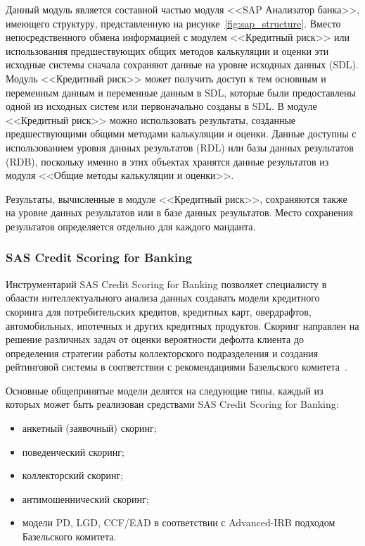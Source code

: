 Данный модуль является составной частью модуля <<SAP Анализатор банка>>,
имеющего структуру, представленную на рисунке~\ref{fig:sap_structure}.
Вместо непосредственного обмена информацией с модулем <<Кредитный риск>>
или использования предшествующих общих методов калькуляции и оценки эти исходные
системы сначала сохраняют данные на уровне исходных данных (SDL).
Модуль <<Кредитный риск>> может получить доступ к тем основным и переменным данным и переменные данным в SDL,
которые были предоставлены одной из исходных систем или первоначально созданы в SDL.
В модуле <<Кредитный риск>> можно использовать результаты, созданные предшествующими
общими методами калькуляции и оценки. Данные доступны с использованием уровня данных результатов (RDL)
или базы данных результатов (RDB),
поскольку именно в этих объектах хранятся данные результатов из модуля <<Общие методы калькуляции и оценки>>.

Результаты, вычисленные в модуле <<Кредитный риск>>, сохраняются также на уровне данных результатов
или в базе данных результатов. Место сохранения результатов определяется отдельно для каждого манданта.

\subsubsection{SAS Credit Scoring for Banking}

Инструментарий SAS Credit Scoring for Banking позволяет специалисту в области интеллектуального анализа
данных создавать модели кредитного скоринга для потребительских кредитов, кредитных карт, овердрафтов,
автомобильных, ипотечных и других кредитных продуктов.
Скоринг направлен на решение различных задач от оценки вероятности дефолта клиента до определения
стратегии работы коллекторского подразделения и создания рейтинговой системы в соответствии
с рекомендациями Базельского комитета~\cite{sas_scoring_for_banking}.

Основные общепринятые модели делятся на следующие типы, каждый из которых может быть реализован средствами
SAS Credit Scoring for Banking:
\begin{itemize}
\item анкетный (заявочный) скоринг;
\item поведенческий скоринг;
\item коллекторский скоринг;
\item антимошеннический скоринг;
\item модели PD, LGD, CCF/EAD в соответствии с Advanced-IRB подходом Базельского комитета.
\end{itemize}

